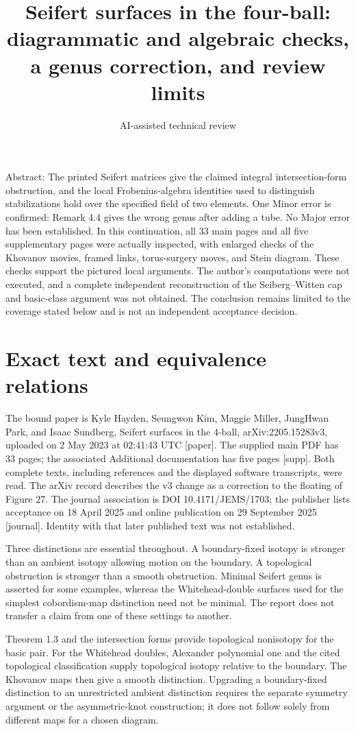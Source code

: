 \documentclass[10pt]{article}
\title{Seifert surfaces in the four-ball: diagrammatic and algebraic checks, a genus correction, and review limits}
\author{AI-assisted technical review}
\date{}
\begin{document}
\maketitle
Abstract: The printed Seifert matrices give the claimed integral intersection-form obstruction, and the local Frobenius-algebra identities used to distinguish stabilizations hold over the specified field of two elements. One Minor error is confirmed: Remark 4.4 gives the wrong genus after adding a tube. No Major error has been established. In this continuation, all 33 main pages and all five supplementary pages were actually inspected, with enlarged checks of the Khovanov movies, framed links, torus-surgery moves, and Stein diagram. These checks support the pictured local arguments. The author’s computations were not executed, and a complete independent reconstruction of the Seiberg–Witten cap and basic-class argument was not obtained. The conclusion remains limited to the coverage stated below and is not an independent acceptance decision.\par
\section*{Exact text and equivalence relations}
The bound paper is Kyle Hayden, Seungwon Kim, Maggie Miller, JungHwan Park, and Isaac Sundberg, Seifert surfaces in the 4-ball, arXiv:2205.15283v3, uploaded on 2 May 2023 at 02:41:43 UTC [paper]. The supplied main PDF has 33 pages; the associated Additional documentation has five pages [supp]. Both complete texts, including references and the displayed software transcripts, were read. The arXiv record describes the v3 change as a correction to the floating of Figure 27. The journal association is DOI 10.4171/JEMS/1703; the publisher lists acceptance on 18 April 2025 and online publication on 29 September 2025 [journal]. Identity with that later published text was not established.\par
Three distinctions are essential throughout. A boundary-fixed isotopy is stronger than an ambient isotopy allowing motion on the boundary. A topological obstruction is stronger than a smooth obstruction. Minimal Seifert genus is asserted for some examples, whereas the Whitehead-double surfaces used for the simplest cobordism-map distinction need not be minimal. The report does not transfer a claim from one of these settings to another.\par
Theorem 1.3 and the intersection forms provide topological nonisotopy for the basic pair. For the Whitehead doubles, Alexander polynomial one and the cited topological classification supply topological isotopy relative to the boundary. The Khovanov maps then give a smooth distinction. Upgrading a boundary-fixed distinction to an unrestricted ambient distinction requires the separate symmetry argument or the asymmetric-knot construction; it does not follow solely from different maps for a chosen diagram.\par
\end{document}

